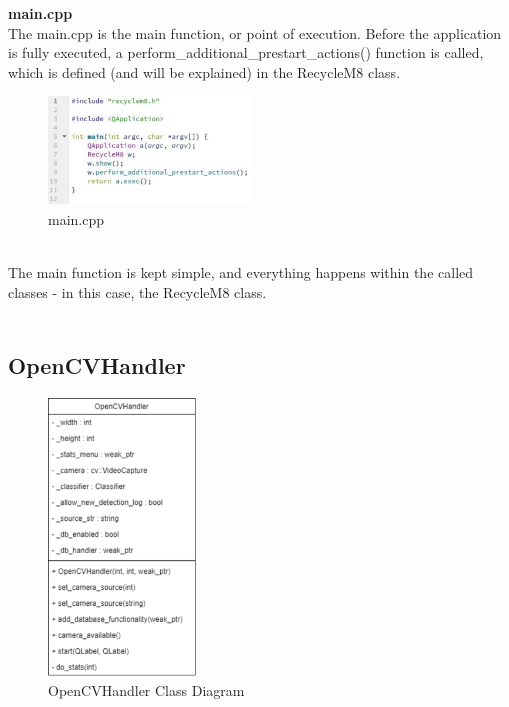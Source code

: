 \documentclass[conference]{IEEEtran}
\begin{document}
\textbf{main.cpp}~\\

The main.cpp is the main function, or point of execution. Before the application is fully executed, a perform\_additional\_prestart\_actions() function is called, which is defined (and will be explained) in the RecycleM8 class.

\begin{figure}[h]
    \centering
    \includegraphics[width=0.48\textwidth]{images/sourcecode/main_cpp.eps}
    \caption{main.cpp}
\end{figure}~\\

The main function is kept simple, and everything happens within the called classes - in this case, the RecycleM8 class.~\\~\\

\subsection{OpenCVHandler}

\begin{figure}[h]
    \centering
    \includegraphics[width=0.35\textwidth]{images/code_diagrams/opencvhandler_uml.eps}
    \caption{OpenCVHandler Class Diagram}
\end{figure}~\\
\end{document}
